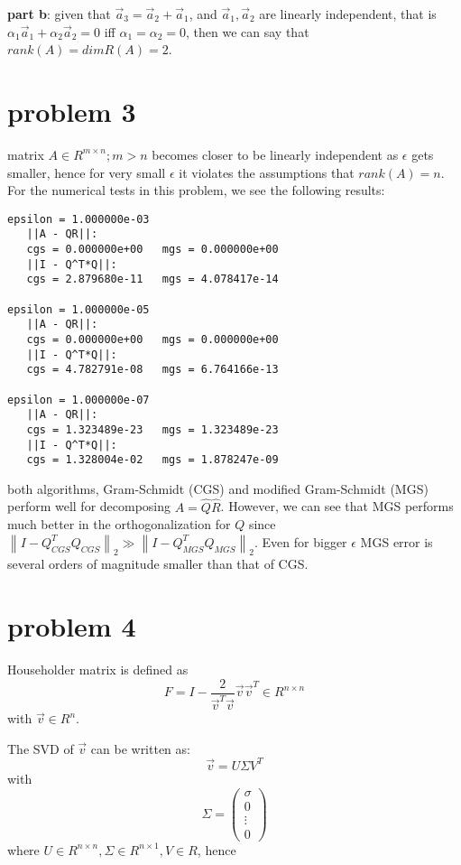 \documentclass[10pt]{article}
\newcommand{\normt}[1]{\left\lVert#1\right\rVert_2}
\begin{document}
\textbf{part b}: given that $\vec{a}_3 = \vec{a}_2 +\vec{a}_1$, and 
$\vec{a}_1,\vec{a}_2$ are linearly independent, that is $\alpha_1 \vec{a}_1+\alpha_2\vec{a}_2 = 0 $ iff $ \alpha_1=\alpha_2=0$, then we can say
that $rank(A) = dim R(A) = 2$.


\section{problem 3}
matrix $A\in R^{m\times n}; m>n$ becomes closer to be
 linearly independent as $\epsilon$ gets 
smaller, hence for very small $\epsilon$ it violates the assumptions
that $rank(A) = n$.
 For the numerical tests in this problem, we see the following results:

\begin{verbatim}
epsilon = 1.000000e-03
   ||A - QR||:
   cgs = 0.000000e+00   mgs = 0.000000e+00 
   ||I - Q^T*Q||:
   cgs = 2.879680e-11   mgs = 4.078417e-14 

epsilon = 1.000000e-05
   ||A - QR||:
   cgs = 0.000000e+00   mgs = 0.000000e+00 
   ||I - Q^T*Q||:
   cgs = 4.782791e-08   mgs = 6.764166e-13 

epsilon = 1.000000e-07
   ||A - QR||:
   cgs = 1.323489e-23   mgs = 1.323489e-23 
   ||I - Q^T*Q||:
   cgs = 1.328004e-02   mgs = 1.878247e-09 
\end{verbatim}

both algorithms, Gram-Schmidt (CGS) and modified Gram-Schmidt (MGS) 
perform well for decomposing $A = \hat{Q}\hat{R}$. However,
we can see that MGS performs much better in the orthogonalization
for $Q$ since $\normt{I-Q^T_{CGS} Q_{CGS}} \gg \normt{I-Q^T_{MGS} Q_{MGS}}$. Even for
bigger $\epsilon$ MGS error is several orders of magnitude smaller
than that of CGS.



\section{problem 4}
Householder matrix is defined as 
\[F = I - \frac{2}{\vec{v}^T\vec{v}}\vec{v}\vec{v}^T  \in R^{n\times n}\]
with $\vec{v} \in R^n$.

The SVD of $\vec{v}$ can be written as:
\[
  \vec{v} = U \Sigma V^T
\]
with 
\[
\Sigma =
 \begin{pmatrix}
  \sigma \\
    0    \\
    \vdots \\
    0
 \end{pmatrix} 
\]
where $U \in R^{n\times n}, \Sigma \in R^{n\times 1}, V\in R$, hence
\end{document}
